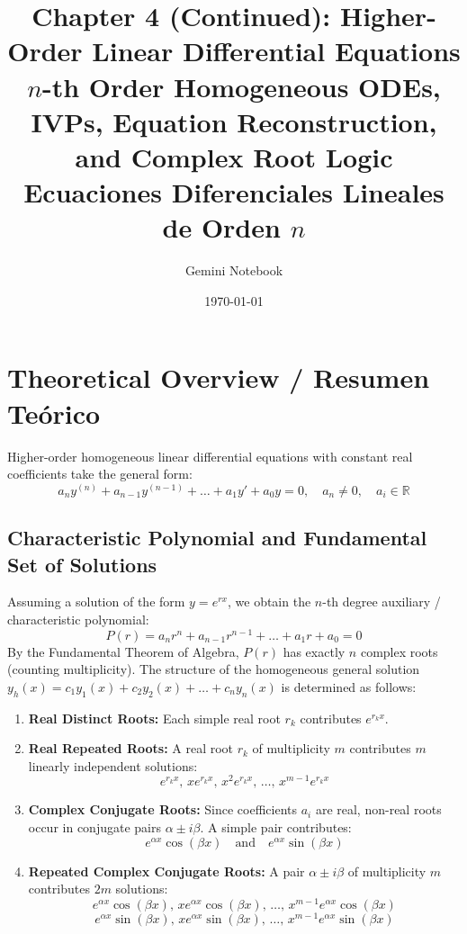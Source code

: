 \documentclass[11pt,letterpaper]{article}
\title{\textbf{Chapter 4 (Continued): Higher-Order Linear Differential Equations}\\
\large $n$-th Order Homogeneous ODEs, IVPs, Equation Reconstruction, and Complex Root Logic\\
\normalsize Ecuaciones Diferenciales Lineales de Orden $n$}
\author{Gemini Notebook}
\date{\today}
\begin{document}
\maketitle

\section{Theoretical Overview / Resumen Teórico}

Higher-order homogeneous linear differential equations with constant real coefficients take the general form:
\begin{equation}
    a_n y^{(n)} + a_{n-1} y^{(n-1)} + \dots + a_1 y' + a_0 y = 0, \quad a_n \neq 0, \quad a_i \in \mathbb{R}
\end{equation}

\subsection{Characteristic Polynomial and Fundamental Set of Solutions}
Assuming a solution of the form $y = e^{rx}$, we obtain the $n$-th degree auxiliary / characteristic polynomial:
\begin{equation}
    P(r) = a_n r^n + a_{n-1} r^{n-1} + \dots + a_1 r + a_0 = 0
\end{equation}
By the Fundamental Theorem of Algebra, $P(r)$ has exactly $n$ complex roots (counting multiplicity). The structure of the homogeneous general solution $y_h(x) = c_1 y_1(x) + c_2 y_2(x) + \dots + c_n y_n(x)$ is determined as follows:

\begin{enumerate}
    \item \textbf{Real Distinct Roots:} Each simple real root $r_k$ contributes $e^{r_k x}$.
    \item \textbf{Real Repeated Roots:} A real root $r_k$ of multiplicity $m$ contributes $m$ linearly independent solutions:
    \[ e^{r_k x}, \, x e^{r_k x}, \, x^2 e^{r_k x}, \, \dots, \, x^{m-1} e^{r_k x} \]
    \item \textbf{Complex Conjugate Roots:} Since coefficients $a_i$ are real, non-real roots occur in conjugate pairs $\alpha \pm i \beta$. A simple pair contributes:
    \[ e^{\alpha x} \cos(\beta x) \quad \text{and} \quad e^{\alpha x} \sin(\beta x) \]
    \item \textbf{Repeated Complex Conjugate Roots:} A pair $\alpha \pm i \beta$ of multiplicity $m$ contributes $2m$ solutions:
    \[ e^{\alpha x} \cos(\beta x), \, x e^{\alpha x} \cos(\beta x), \, \dots, \, x^{m-1} e^{\alpha x} \cos(\beta x) \]
    \[ e^{\alpha x} \sin(\beta x), \, x e^{\alpha x} \sin(\beta x), \, \dots, \, x^{m-1} e^{\alpha x} \sin(\beta x) \]
\end{enumerate}
\end{document}

